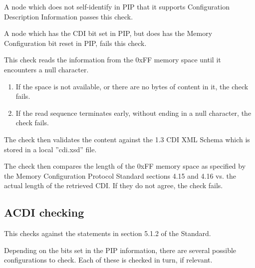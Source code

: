 A node which does not self-identify in PIP that it supports
Configuration Description Information passes this check.

A node which has the CDI bit set in PIP, but does
has the Memory Configuration bit reset in PIP, fails this check.
\pipsetFootnote

This check reads the information from the 0xFF memory space
until it encounters a null character.
\begin{enumerate}
\item If the space is not available, or there are no bytes of content in it, the check fails.
\item If the read sequence terminates early, without ending in a null character, the check fails.
\end{enumerate}
 
The check then validates the content against the 1.3 CDI XML Schema
which is stored in a local ”cdi.xsd” file.

The check then compares the length of the 0xFF memory space 
as specified by the Memory Configuration Protocol Standard sections 4.15 and 4.16
vs. the actual length of the retrieved CDI.
If they do not agree, the check fails.

\subsection{ACDI checking}

This checks against the statements in section 5.1.2 of the Standard.

Depending on the bits set in the PIP information, there are several 
possible configurations to check. Each of these is checked in turn, if relevant.

